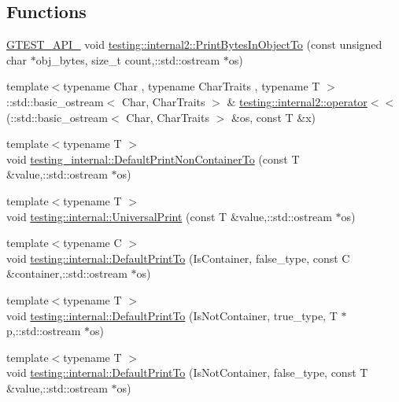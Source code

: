 \subsection*{Functions}
\begin{DoxyCompactItemize}
\item 
\hyperlink{gtest-port_8h_aa73be6f0ba4a7456180a94904ce17790}{G\+T\+E\+S\+T\+\_\+\+A\+P\+I\+\_\+} void \hyperlink{namespacetesting_1_1internal2_a04a384ee5de3a9f4f00a6052ea79b495}{testing\+::internal2\+::\+Print\+Bytes\+In\+Object\+To} (const unsigned char $\ast$obj\+\_\+bytes, size\+\_\+t count,\+::std\+::ostream $\ast$os)
\item 
{\footnotesize template$<$typename Char , typename Char\+Traits , typename T $>$ }\\\+::std\+::basic\+\_\+ostream$<$ Char, Char\+Traits $>$ \& \hyperlink{namespacetesting_1_1internal2_a07dbe129beb8952074f04b599dfce39b}{testing\+::internal2\+::operator$<$$<$} (\+::std\+::basic\+\_\+ostream$<$ Char, Char\+Traits $>$ \&os, const T \&x)
\item 
{\footnotesize template$<$typename T $>$ }\\void \hyperlink{namespacetesting__internal_ad4e5852805f397248a0867c0c4265ea5}{testing\+\_\+internal\+::\+Default\+Print\+Non\+Container\+To} (const T \&value,\+::std\+::ostream $\ast$os)
\item 
{\footnotesize template$<$typename T $>$ }\\void \hyperlink{namespacetesting_1_1internal_ad121a890bddf866e59605d1a0198dada}{testing\+::internal\+::\+Universal\+Print} (const T \&value,\+::std\+::ostream $\ast$os)
\item 
{\footnotesize template$<$typename C $>$ }\\void \hyperlink{namespacetesting_1_1internal_a729016f07085b1cfb44d21331f791141}{testing\+::internal\+::\+Default\+Print\+To} (Is\+Container, false\+\_\+type, const C \&container,\+::std\+::ostream $\ast$os)
\item 
{\footnotesize template$<$typename T $>$ }\\void \hyperlink{namespacetesting_1_1internal_aa8dafaf55c18333baa5fdb858e69be96}{testing\+::internal\+::\+Default\+Print\+To} (Is\+Not\+Container, true\+\_\+type, T $\ast$p,\+::std\+::ostream $\ast$os)
\item 
{\footnotesize template$<$typename T $>$ }\\void \hyperlink{namespacetesting_1_1internal_a29e705ab252af57e825a086bb49c4831}{testing\+::internal\+::\+Default\+Print\+To} (Is\+Not\+Container, false\+\_\+type, const T \&value,\+::std\+::ostream $\ast$os)

\end{DoxyCompactItemize}
